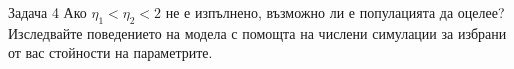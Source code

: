 \begin{frame}[t]{Задача 4}
  Ако $\eta_{1} < \eta_{2} < 2$ не е изпълнено, възможно ли е популацията да оцелее? Изследвайте поведението на модела с помощта на числени симулации за
  избрани от вас стойности на параметрите.
\end{frame}
